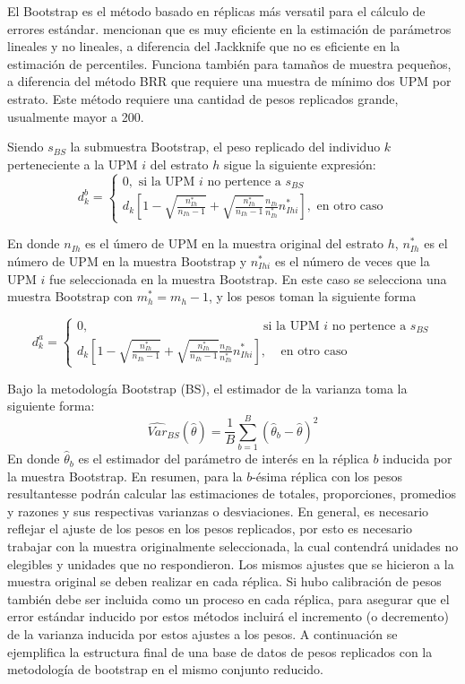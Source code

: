 \documentclass[
  12pt,
  spanish,
]{book}
\begin{document}
El Bootstrap es el método basado en réplicas más versatil para el cálculo de errores estándar. \citet{Valliant_Dever_2017} mencionan que es muy eficiente en la estimación de parámetros lineales y no lineales, a diferencia del Jackknife que no es eficiente en la estimación de percentiles. Funciona también para tamaños de muestra pequeños, a diferencia del método BRR que requiere una muestra de mínimo dos UPM por estrato. Este método requiere una cantidad de pesos replicados grande, usualmente mayor a 200.

Siendo \(s_{BS}\) la submuestra Bootstrap, el peso replicado del individuo \(k\) perteneciente a la UPM \(i\) del estrato \(h\) sigue la siguiente expresión:
\[
d_k^b = 
\begin{cases}
0, \text{\ si la UPM $i$ no pertence a $s_{BS}$} \\
d_k\left[1 - \sqrt{\frac{n_{Ih}^*}{n_{Ih}-1}}+\sqrt{\frac{n_{Ih}^*}{n_{Ih}-1}}
\frac{n_{Ih}}{n_{Ih}^*}n_{Ihi}^*
\right], \text{\ en otro caso} 
\end{cases}
\]

En donde \(n_{Ih}\) es el úmero de UPM en la muestra original del estrato \(h\), \(n_{Ih}^*\) es el número de UPM en la muestra Bootstrap y \(n_{Ihi}^*\) es el número de veces que la UPM \(i\) fue seleccionada en la muestra Bootstrap. En este caso se selecciona una muestra Bootstrap con \(m^*_h = m_h - 1\), y los pesos toman la siguiente forma

\[
d_k^a = 
\begin{cases}
0,  \ \ \  \ \ \ \ \ \  \ \ \  \ \ \  \ \ \  \ \ \  \ \ \  \ \ \  \ \ \  \ \ \  \ \ \  \ \ \  \ \ \  \ \ \  \ \ \ \ \ \  \ \ \  \ \ \  \ \ \  \ \ \ \text{si la UPM $i$ no pertence a $s_{BS}$} \\
d_k\left[1 - \sqrt{\frac{n_{Ih}^*}{n_{Ih}-1}}+\sqrt{\frac{n_{Ih}^*}{n_{Ih}-1}}
\frac{n_{Ih}}{n_{Ih}^*}n_{Ihi}^*
\right],  \ \ \  \ \ \text{en otro caso} 
\end{cases}
\]

Bajo la metodología Bootstrap (BS), el estimador de la varianza toma la siguiente forma:
\[
\widehat{Var}_{BS}(\hat{\theta}) = \frac{1}{B}\sum_{b=1}^B(\hat{\theta}_b - \hat\theta )^2
\]
En donde \(\hat{\theta}_b\) es el estimador del parámetro de interés en la réplica \(b\) inducida por la muestra Bootstrap. En resumen, para la \(b\)-ésima réplica con los pesos resultantesse podrán calcular las estimaciones de totales, proporciones, promedios y razones y sus respectivas varianzas o desviaciones. En general, es necesario reflejar el ajuste de los pesos en los pesos replicados, por esto es necesario trabajar con la muestra originalmente seleccionada, la cual contendrá unidades no elegibles y unidades que no respondieron. Los mismos ajustes que se hicieron a la muestra original se deben realizar en cada réplica. Si hubo calibración de pesos también debe ser incluida como un proceso en cada réplica, para asegurar que el error estándar inducido por estos métodos incluirá el incremento (o decremento) de la varianza inducida por estos ajustes a los pesos. A continuación se ejemplifica la estructura final de una base de datos de pesos replicados con la metodología de bootstrap en el mismo conjunto reducido.
\end{document}

